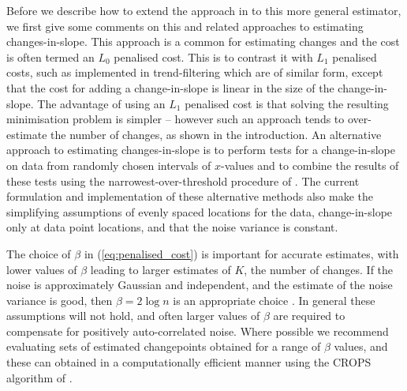 \documentclass[article]{jss}
\begin{document}
Before we describe how to extend the approach in \cite{fearnhead2019detecting} to this more general estimator, we first give some comments on this and related approaches to estimating changes-in-slope. This approach is a common for estimating changes \citep{jackson2005algorithm,killick2012optimal} and the cost is often termed an $L_0$ penalised cost. This is to contrast it with $L_1$ penalised costs, such as implemented in trend-filtering \citep{kim2009ell_1,tibshirani2014adaptive} which are of similar form, except that the cost for adding a change-in-slope is linear in the size of the change-in-slope. The advantage of using an $L_1$ penalised cost is that solving the resulting minimisation problem is simpler -- however such an approach tends to over-estimate the number of changes, as shown in the introduction. An alternative approach to estimating changes-in-slope is to perform tests for a change-in-slope on data from randomly chosen intervals of $x$-values and to combine the results of these tests using the narrowest-over-threshold procedure of \cite{baranowski2016narrowest}. The current formulation and implementation of these alternative methods also make the simplifying assumptions of evenly spaced locations for the data, change-in-slope only at data point locations, and that the noise variance is constant. %

The choice of $\beta$ in (\ref{eq:penalised_cost}) is important for accurate estimates, with lower values of $\beta$ leading to larger estimates of $K$, the number of changes. If the noise is approximately Gaussian and independent, and the estimate of the noise variance is good, then $\beta=2\log n$ is an appropriate choice  \citep{fearnhead2019detecting}. In general these assumptions will not hold, and often larger values of $\beta$ are required to compensate for positively auto-correlated noise. Where possible we recommend evaluating sets of estimated changepoints obtained for a range of $\beta$ values, and these can obtained in a computationally efficient manner using the CROPS algorithm of \cite{haynes2017computationally}.
\end{document}
